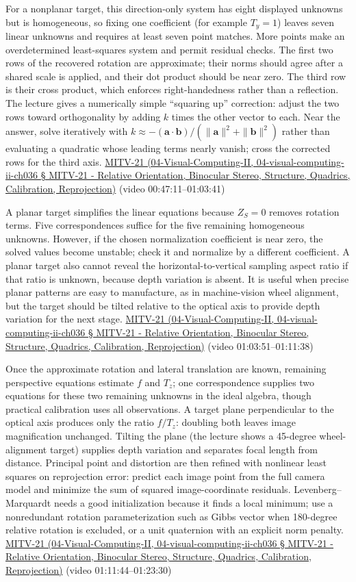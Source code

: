 For a nonplanar target, this direction-only system has eight displayed unknowns but is homogeneous, so fixing one coefficient (for example \(T_y=1\)) leaves seven linear unknowns and requires at least seven point matches. More points make an overdetermined least-squares system and permit residual checks. The first two rows of the recovered rotation are approximate; their norms should agree after a shared scale is applied, and their dot product should be near zero. The third row is their cross product, which enforces right-handedness rather than a reflection. The lecture gives a numerically simple ``squaring up'' correction: adjust the two rows toward orthogonality by adding \(k\) times the other vector to each. Near the answer, solve iteratively with \(k\approx-(\mathbf{a}\cdot\mathbf{b})/(\|\mathbf{a}\|^2+\|\mathbf{b}\|^2)\) rather than evaluating a quadratic whose leading terms nearly vanish; cross the corrected rows for the third axis. \href{}{MITV-21 (04-Visual-Computing-II, 04-visual-computing-ii-ch036 § MITV-21 - Relative Orientation, Binocular Stereo, Structure, Quadrics, Calibration, Reprojection)} (video 00:47:11--01:03:41)

A planar target simplifies the linear equations because \(Z_S=0\) removes rotation terms. Five correspondences suffice for the five remaining homogeneous unknowns. However, if the chosen normalization coefficient is near zero, the solved values become unstable; check it and normalize by a different coefficient. A planar target also cannot reveal the horizontal-to-vertical sampling aspect ratio if that ratio is unknown, because depth variation is absent. It is useful when precise planar patterns are easy to manufacture, as in machine-vision wheel alignment, but the target should be tilted relative to the optical axis to provide depth variation for the next stage. \href{}{MITV-21 (04-Visual-Computing-II, 04-visual-computing-ii-ch036 § MITV-21 - Relative Orientation, Binocular Stereo, Structure, Quadrics, Calibration, Reprojection)} (video 01:03:51--01:11:38)

Once the approximate rotation and lateral translation are known, remaining perspective equations estimate \(f\) and \(T_z\); one correspondence supplies two equations for these two remaining unknowns in the ideal algebra, though practical calibration uses all observations. A target plane perpendicular to the optical axis produces only the ratio \(f/T_z\): doubling both leaves image magnification unchanged. Tilting the plane (the lecture shows a 45-degree wheel-alignment target) supplies depth variation and separates focal length from distance. Principal point and distortion are then refined with nonlinear least squares on reprojection error: predict each image point from the full camera model and minimize the sum of squared image-coordinate residuals. Levenberg--Marquardt needs a good initialization because it finds a local minimum; use a nonredundant rotation parameterization such as Gibbs vector when 180-degree relative rotation is excluded, or a unit quaternion with an explicit norm penalty. \href{}{MITV-21 (04-Visual-Computing-II, 04-visual-computing-ii-ch036 § MITV-21 - Relative Orientation, Binocular Stereo, Structure, Quadrics, Calibration, Reprojection)} (video 01:11:44--01:23:30)

